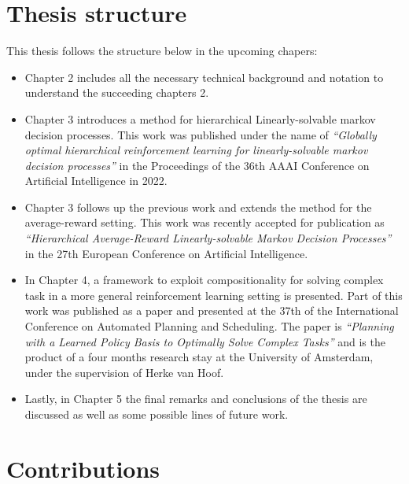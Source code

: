 \section{Thesis structure}

This thesis follows the structure below in the upcoming chapers:
\begin{itemize}
    \item Chapter 2 includes all the necessary technical background and notation to understand the succeeding chapters 2.  
    \item Chapter 3 introduces a method for hierarchical Linearly-solvable markov decision processes. This work was published under the name of \textit{``Globally optimal hierarchical reinforcement learning for linearly-solvable markov decision processes''} in the Proceedings of the 36th AAAI Conference on Artificial Intelligence in 2022.
    \item Chapter 3 follows up the previous work and extends the method for the average-reward setting. This work was recently accepted for publication as \textit{``Hierarchical Average-Reward Linearly-solvable Markov Decision Processes''} in the 27th European Conference on Artificial Intelligence.
    \item In Chapter 4, a framework to exploit compositionality for solving complex task in a more general reinforcement learning setting is presented. Part of this work was published as a paper and presented at the 37th of the International Conference on Automated Planning and Scheduling. The paper is \textit{``Planning with a Learned Policy Basis to Optimally Solve Complex Tasks''} and is the product of a four months research stay at the University of Amsterdam, under the supervision of Herke van Hoof.
    \item Lastly, in Chapter 5 the final remarks and conclusions of the thesis are discussed as well as some possible lines of future work.
\end{itemize}

\section{Contributions}
